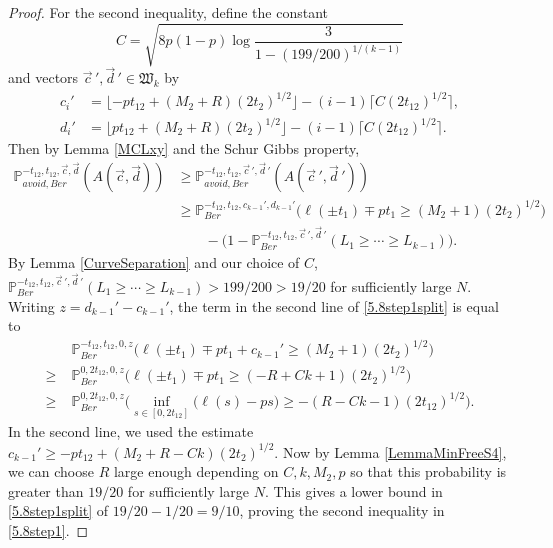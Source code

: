 \begin{proof}
	For the second inequality, define the constant
	\begin{equation}\label{5.8C}
	C = \sqrt{8p(1-p)\log\frac{3}{1-(199/200)^{1/(k-1)}}}
	\end{equation}
	and vectors $\vec{c}\,', \vec{d}\,' \in \mathfrak{W}_k$ by
	\begin{align*}
	c_i' &= \lfloor -pt_{12} + (M_2+R)(2t_2)^{1/2}\rfloor - (i-1)\lceil C(2t_{12})^{1/2}\rceil,\\
	d_i' &= \lfloor pt_{12} + (M_2+R)(2t_2)^{1/2}\rfloor - (i-1)\lceil C(2t_{12})^{1/2}\rceil.
	\end{align*}
	Then by Lemma \ref{MCLxy} and the Schur Gibbs property,
	\begin{equation}\label{5.8step1split}
	\begin{split}
	\mathbb{P}^{-t_{12}, t_{12}, \vec{c}, \vec{d}}_{avoid, Ber} (A(\vec{c}, \vec{d})) &\geq \mathbb{P}^{-t_{12}, t_{12}, \vec{c}\,', \vec{d}\,'}_{avoid, Ber}(A(\vec{c}\,', \vec{d}\,'))\\ 
	&\geq \mathbb{P}^{-t_{12}, t_{12}, c_{k-1}', d_{k-1}'}_{Ber}\Big(\ell(\pm t_1) \mp pt_1 \geq (M_2+1)(2t_2)^{1/2}\Big)\\
	&\qquad - \big( 1 - \mathbb{P}^{-t_{12}, t_{12}, \vec{c}\,', \vec{d}\,'}_{Ber}(L_1 \geq \cdots \geq L_{k-1})\big).
	\end{split}
	\end{equation}
	By Lemma \ref{CurveSeparation} and our choice of $C$, $\mathbb{P}^{-t_{12}, t_{12}, \vec{c}\,', \vec{d}\,'}_{Ber}(L_1 \geq \cdots \geq L_{k-1})>199/200>19/20$ for sufficiently large $N$. Writing $z = d_{k-1}' - c_{k-1}'$, the term in the second line of \eqref{5.8step1split} is equal to
	\begin{align*}
	&\mathbb{P}^{-t_{12}, t_{12}, 0, z}_{Ber}\Big(\ell(\pm t_1) \mp pt_1 + c_{k-1}' \geq (M_2 + 1)(2t_2)^{1/2}\Big)\\
	\geq \; & \mathbb{P}^{0, 2t_{12}, 0, z}_{Ber}\Big(\ell(\pm t_1) \mp pt_1 \geq (-R+Ck+1)(2t_2)^{1/2}\Big)\\
	\geq \; & \mathbb{P}^{0, 2t_{12}, 0, z}_{Ber}\Big(\inf_{s\in[0,2t_{12}]}\big(\ell(s) - ps\big) \geq -(R-Ck-1)(2t_{12})^{1/2}\Big).
	\end{align*}
	In the second line, we used the estimate $c_{k-1}' \geq -pt_{12} + (M_2+R-Ck)(2t_2)^{1/2}$. Now by Lemma \ref{LemmaMinFreeS4}, we can choose $R$ large enough depending on $C,k,M_2,p$ so that this probability is greater than $19/20$ for sufficiently large $N$. This gives a lower bound in \eqref{5.8step1split} of $19/20 - 1/20 = 9/10$, proving the second inequality in \eqref{5.8step1}.
	

\end{proof}
